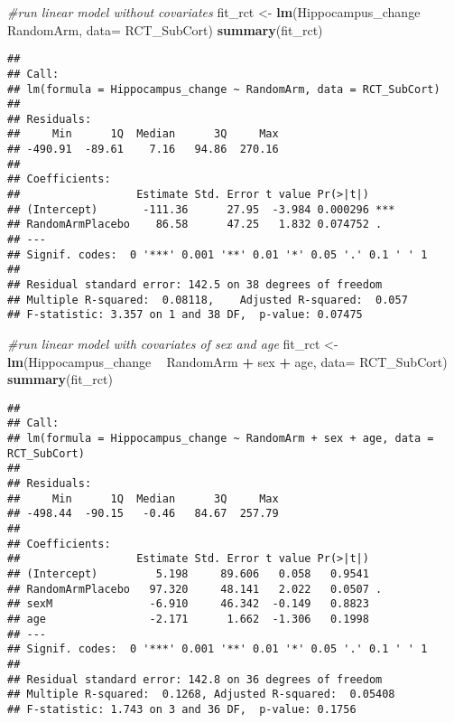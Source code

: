 \documentclass[]{article}
\newenvironment{Shaded}{\begin{snugshade}}{\end{snugshade}}
\newcommand{\KeywordTok}[1]{\textcolor[rgb]{0.13,0.29,0.53}{\textbf{#1}}}
\newcommand{\DataTypeTok}[1]{\textcolor[rgb]{0.13,0.29,0.53}{#1}}
\newcommand{\StringTok}[1]{\textcolor[rgb]{0.31,0.60,0.02}{#1}}
\newcommand{\CommentTok}[1]{\textcolor[rgb]{0.56,0.35,0.01}{\textit{#1}}}
\newcommand{\OperatorTok}[1]{\textcolor[rgb]{0.81,0.36,0.00}{\textbf{#1}}}
\newcommand{\NormalTok}[1]{#1}
\theoremstyle{definition}
\theoremstyle{definition}
\theoremstyle{definition}
\theoremstyle{remark}
\begin{document}
\begin{Shaded}
\begin{Highlighting}[]
\CommentTok{#run linear model without covariates}
\NormalTok{  fit_rct <-}\StringTok{ }\KeywordTok{lm}\NormalTok{(Hippocampus_change }\OperatorTok{~}\StringTok{ }\NormalTok{RandomArm, }\DataTypeTok{data=}\NormalTok{ RCT_SubCort)}
  \KeywordTok{summary}\NormalTok{(fit_rct)}
\end{Highlighting}
\end{Shaded}

\begin{verbatim}
## 
## Call:
## lm(formula = Hippocampus_change ~ RandomArm, data = RCT_SubCort)
## 
## Residuals:
##     Min      1Q  Median      3Q     Max 
## -490.91  -89.61    7.16   94.86  270.16 
## 
## Coefficients:
##                  Estimate Std. Error t value Pr(>|t|)    
## (Intercept)       -111.36      27.95  -3.984 0.000296 ***
## RandomArmPlacebo    86.58      47.25   1.832 0.074752 .  
## ---
## Signif. codes:  0 '***' 0.001 '**' 0.01 '*' 0.05 '.' 0.1 ' ' 1
## 
## Residual standard error: 142.5 on 38 degrees of freedom
## Multiple R-squared:  0.08118,    Adjusted R-squared:  0.057 
## F-statistic: 3.357 on 1 and 38 DF,  p-value: 0.07475
\end{verbatim}

\begin{Shaded}
\begin{Highlighting}[]
\CommentTok{#run linear model with covariates of sex and age}
\NormalTok{  fit_rct <-}\StringTok{ }\KeywordTok{lm}\NormalTok{(Hippocampus_change }\OperatorTok{~}\StringTok{ }\NormalTok{RandomArm }\OperatorTok{+}\StringTok{ }\NormalTok{sex }\OperatorTok{+}\StringTok{ }\NormalTok{age, }\DataTypeTok{data=}\NormalTok{ RCT_SubCort)}
  \KeywordTok{summary}\NormalTok{(fit_rct)}
\end{Highlighting}
\end{Shaded}

\begin{verbatim}
## 
## Call:
## lm(formula = Hippocampus_change ~ RandomArm + sex + age, data = RCT_SubCort)
## 
## Residuals:
##     Min      1Q  Median      3Q     Max 
## -498.44  -90.15   -0.46   84.67  257.79 
## 
## Coefficients:
##                  Estimate Std. Error t value Pr(>|t|)  
## (Intercept)         5.198     89.606   0.058   0.9541  
## RandomArmPlacebo   97.320     48.141   2.022   0.0507 .
## sexM               -6.910     46.342  -0.149   0.8823  
## age                -2.171      1.662  -1.306   0.1998  
## ---
## Signif. codes:  0 '***' 0.001 '**' 0.01 '*' 0.05 '.' 0.1 ' ' 1
## 
## Residual standard error: 142.8 on 36 degrees of freedom
## Multiple R-squared:  0.1268, Adjusted R-squared:  0.05408 
## F-statistic: 1.743 on 3 and 36 DF,  p-value: 0.1756
\end{verbatim}
\end{document}
